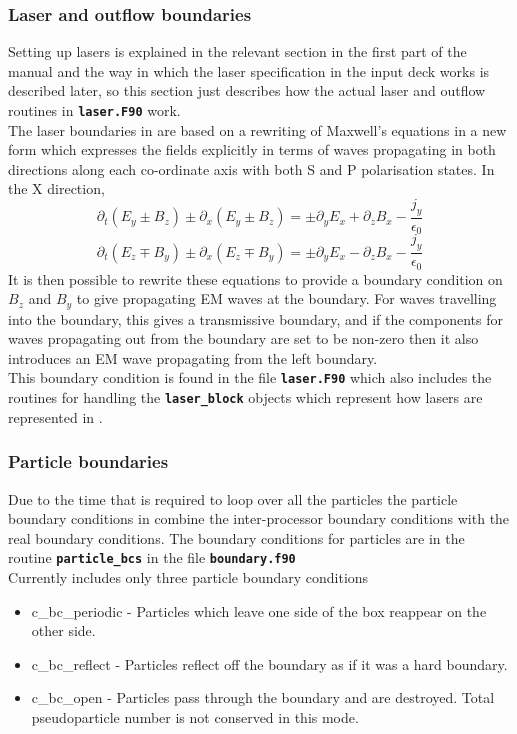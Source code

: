 \documentclass[12pt,a4paper]{article}
\newcommand{\inlinecode}[1]{{\color{warwickred} \bf\texttt{#1}}}
\newcommand{\EPOCH}{{\color{warwickdark}\fontfamily{phv}\selectfont{EPOCH}}}
\begin{document}
\subsubsection{Laser and outflow boundaries}
Setting up lasers is explained in the relevant section in the first part of the
manual and the way in which the laser specification in the input deck works is
described later, so this section just describes how the actual laser and
outflow routines in \inlinecode{laser.F90} work.\\

The laser boundaries in {\EPOCH} are based on a rewriting of Maxwell's
equations in a new form which expresses the fields explicitly in terms of waves
propagating in both directions along each co-ordinate axis with both S and P
polarisation states. In the X direction,
\[
\partial_t(E_y \pm B_z) \pm \partial_x(E_y \pm B_z) = \pm \partial_yE_x
+ \partial_zB_x -\frac{j_y}{\epsilon_0}
\]
\[
\partial_t(E_z \mp B_y) \pm \partial_x(E_z \mp B_y) = \pm \partial_yE_x
- \partial_zB_x -\frac{j_y}{\epsilon_0}
\]
It is then possible to rewrite these equations to provide a boundary condition
on $B_z$ and $B_y$ to give propagating EM waves at the boundary. For waves
travelling into the boundary, this gives a transmissive boundary, and if the
components for waves propagating out from the boundary are set to be non-zero
then it also introduces an EM wave propagating from the left boundary.\\

This boundary condition is found in the file \inlinecode{laser.F90} which also
includes the routines for handling the \inlinecode{laser\_block} objects which
represent how lasers are represented in {\EPOCH}.

\subsubsection{Particle boundaries}
Due to the time that is required to loop over all the particles the particle
boundary conditions in {\EPOCH} combine the inter-processor boundary conditions
with the real boundary conditions. The boundary conditions for particles are in
the routine \inlinecode{particle\_bcs} in the file \inlinecode{boundary.f90} \\
Currently {\EPOCH} includes only three particle boundary conditions
\begin{itemize}
\item c\_bc\_periodic - Particles which leave one side of the box reappear on
  the other side.
\item c\_bc\_reflect - Particles reflect off the boundary as if it was a hard
  boundary.
\item c\_bc\_open - Particles pass through the boundary and are destroyed. Total
  pseudoparticle number is not conserved in this mode.
\end{itemize}
\end{document}
